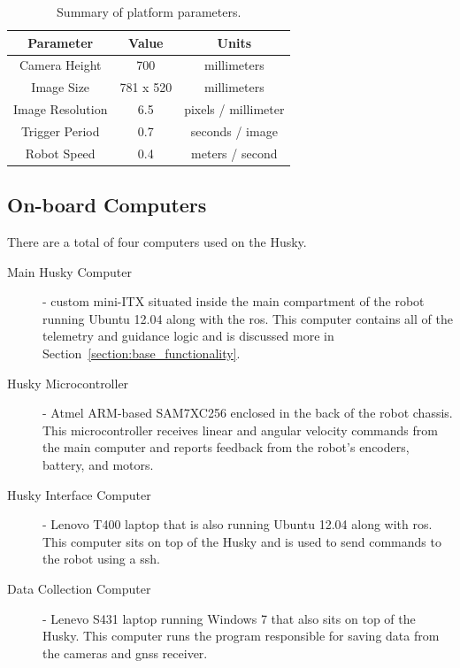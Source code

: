 \begin{table}
    \begin{center}
    \caption{Summary of platform parameters.}
    \begin{tabular}[c]{|c|c|c|}
        \hline
        Parameter & Value & Units \\
        \hline
        Camera Height    & 700       & millimeters         \\
        Image Size       & 781 x 520 & millimeters         \\
        Image Resolution & 6.5       & pixels / millimeter \\
        Trigger Period   & 0.7       & seconds / image     \\
        Robot Speed      & 0.4       & meters / second     \\
        \hline
    \end{tabular}
    \label{table:platform_params}
   \end{center}
\end{table}

\subsection{On-board Computers}

There are a total of four computers used on the Husky.

\begin{description}
\item[Main Husky Computer] - custom mini-ITX situated inside the main compartment of the robot running Ubuntu 12.04 along with the \ac{ros}. This computer contains all of the telemetry and guidance logic and is discussed more in Section~\ref{section:base_functionality}.  
\item[Husky Microcontroller] - Atmel ARM-based SAM7XC256 enclosed in the back of the robot chassis.  This microcontroller receives linear and angular velocity commands from the main computer and reports feedback from the robot's encoders, battery, and motors. 
\item[Husky Interface Computer] - Lenovo T400 laptop that is also running Ubuntu 12.04 along with \ac{ros}.  This computer sits on top of the Husky and is used to send commands to the robot using a \ac{ssh}.
\item[Data Collection Computer] - Lenevo S431 laptop running Windows 7 that also sits on top of the Husky.  This computer runs the program responsible for saving data from the cameras and \ac{gnss} receiver.   
\end{description}

